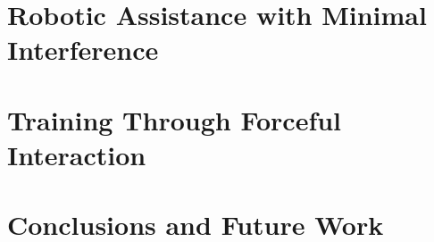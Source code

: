 \documentclass[12pt]{nuthesis}	%
\begin{document}
\chapter{Robotic Assistance with Minimal Interference}
\label{chapter: assistance}


\chapter{Training Through Forceful Interaction}
\label{chapter: training}



\chapter{Conclusions and Future Work}
\label{chapter: conclusions}


%
\clearpage{} %

%

\renewcommand\refname{\begin{centering}References\end{centering}}


%

%
\end{document}
